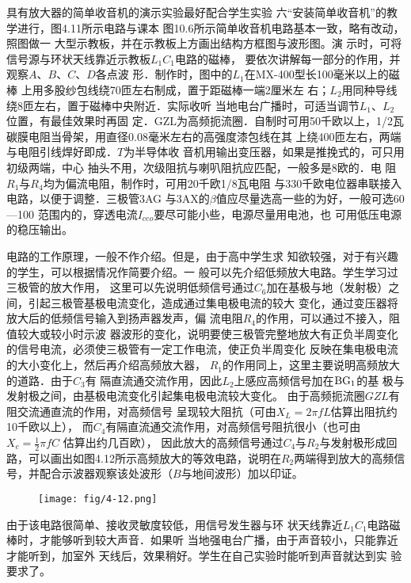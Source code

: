 具有放大器的简单收音机的演示实验最好配合学生实验
六“安装简单收音机”的教学进行，图4.11所示电路与课本
图10.6所示简单收音机电路基本一致，略有改动，照图做一
大型示教板，并在示教板上方画出结构方框图与波形图。演
示时，可将信号源与环状天线靠近示教板$L_1C_1$电路的磁棒，
要依次讲解每一部分的作用，并观察$A$、$B$、$C$、$D$各点波
形．制作时，图中的$L_1$在MX-400型长100毫米以上的磁棒
上用多股纱包线绕70匝左右制成，置于距磁棒一端2厘米左
右；$L_2$用同种导线绕8匝左右，置于磁棒中央附近．实际收听
当地电台广播时，可适当调节$L_1$、$L_2$位置，有最佳效果时再固
定．GZL为高频扼流圈．自制时可用50千欧以上，1/2瓦
碳膜电阻当骨架，用直径0.08毫米左右的高强度漆包线在其
上绕400匝左右，两端与电阻引线焊好即成．$T$为半导体收
音机用输出变压器，如果是推挽式的，可只用初级两端，中心
抽头不用，次级阻抗与喇叭阻抗应匹配，一般多是8欧的．电
阻$R_1$与$R_4$均为偏流电阻，制作时，可用20千欧1/8瓦电阻
与330千欧电位器串联接入电路，以便于调整．三极管3AG
与3AX的$\beta$值应尽量选高一些的为好，一般可选60—100
范围内的，穿透电流$I_{ceo}$要尽可能小些，电源尽量用电池，也
可用低压电源的稳压输出。

电路的工作原理，一般不作介绍。但是，由于高中学生求
知欲较强，对于有兴趣的学生，可以根据情况作简要介绍。一
般可以先介绍低频放大电路。学生学习过三极管的放大作用，
这里可以先说明低频信号通过$C_6$加在基极与地（发射极）之
间，引起三极管基极电流变化，造成通过集电极电流的较大
变化，通过变压器将放大后的低频信号输入到扬声器发声，偏
流电阻$R_4$的作用，可以通过不接入，阻值较大或较小时示波
器波形的变化，说明要使三极管完整地放大有正负半周变化
的信号电流，必须使三极管有一定工作电流，使正负半周变化
反映在集电极电流的大小变化上，然后再介绍高频放大器，
$R_1$的作用同上，这里主要说明高频放大的道路．由于$C_3$有
隔直流通交流作用，因此$L_2$上感应高频信号加在${\rm BG}_1$的基
极与发射极之间，由基极电流变化引起集电极电流较大变化。
由于高频扼流圈$GZL$有阻交流通直流的作用，对高频信号
呈现较大阻抗（可由$X_L=2\pi fL$估算出阻抗约10千欧以上），
而$C_4$有隔直流通交流作用，对高频信号阻抗很小（也可由$X_c=\frac{1}{2}\pi fC$ 估算出约几百欧），
因此放大的高频信号通过$C_4$与$R_2$与发射极形成回路，可以画出如图4.12所示高频放大的等效电路，说明在$R_2$两端得到放大的高频信号，并配合示波器观察该处波形（$B$与地间波形）加以印证。

\begin{figure}[htp]
    \centering
\texttt{[image: fig/4-12.png]}
    \caption{}
\end{figure}

由于该电路很简单、接收灵敏度较低，用信号发生器与环
状天线靠近$L_1C_1$电路磁棒时，才能够听到较大声音．如果听
当地强电台广播，由于声音较小，只能靠近才能听到，加室外
天线后，效果稍好。学生在自己实验时能听到声音就达到实
验要求了。

